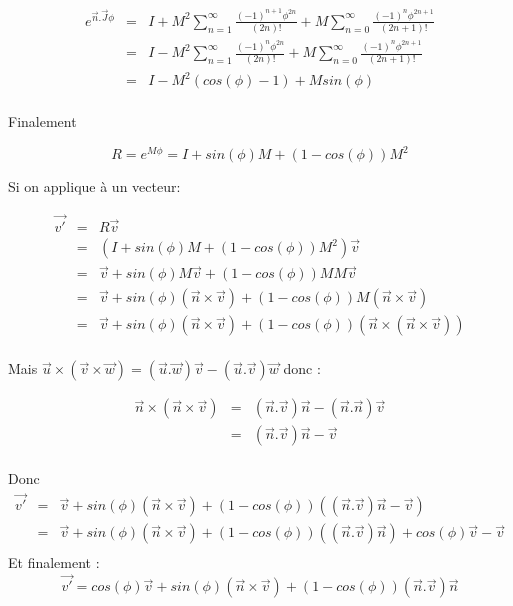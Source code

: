 \documentclass[12pt,a4paper]{article}
\begin{document}
	\begin{eqnarray*}
	e^{\vec{n}.\vec{J}\phi}&=& I+M^2\sum_{n=1}^{\infty} \frac{(-1)^{n+1} \phi^{2n}}{(2n)!} + M\sum_{n=0}^{\infty} \frac{(-1)^{n}\phi^{2n+1}}{(2n+1)!}\\
	&=& I-M^2\sum_{n=1}^{\infty} \frac{(-1)^{n} \phi^{2n}}{(2n)!} + M\sum_{n=0}^{\infty} \frac{(-1)^{n}\phi^{2n+1}}{(2n+1)!}\\
	&=& I-M^2 (cos(\phi)-1) + M sin(\phi)\\
	\end{eqnarray*}
	
	Finalement 
	
	\[
	\boxed{R=e^{M\phi}=I+sin(\phi)M+(1-cos(\phi))M^2 }
	\]
	
	\newpage
	Si on applique à un vecteur:
	
	\begin{eqnarray*}
	\vec{v'}&=& R \vec{v} \\
	&=& (I+sin(\phi)M+(1-cos(\phi))M^2) \vec{v} \\
	&=& \vec{v}+sin(\phi)M\vec{v}+(1-cos(\phi))M M\vec{v}  \\
	&=& \vec{v}+sin(\phi)(\vec{n}\times \vec{v})+(1-cos(\phi))M (\vec{n}\times \vec{v})  \\
	&=& \vec{v}+sin(\phi)(\vec{n}\times \vec{v})+(1-cos(\phi)) (\vec{n}\times (\vec{n}\times \vec{v}))  \\
	\end{eqnarray*}
	
Mais $\vec{u}\times(\vec{v}\times \vec{w})=(\vec{u}.\vec{w})\vec{v}-(\vec{u}.\vec{v})\vec{w}$ donc :
    
    \begin{eqnarray*}
    \vec{n}\times(\vec{n}\times \vec{v})&=&(\vec{n}.\vec{v})\vec{n}-(\vec{n}.\vec{n})\vec{v}\\
	&=&(\vec{n}.\vec{v})\vec{n}-\vec{v}\\	
	\end{eqnarray*}

Donc 
	\begin{eqnarray*}
		\vec{v'}&=& \vec{v}+sin(\phi)(\vec{n}\times \vec{v})+(1-cos(\phi)) ((\vec{n}.\vec{v})\vec{n}-\vec{v})  \\
		&=& \vec{v}+sin(\phi)(\vec{n}\times \vec{v})+(1-cos(\phi)) ((\vec{n}.\vec{v})\vec{n})+cos(\phi)\vec{v}-\vec{v}  \\
	\end{eqnarray*}
Et finalement :
\[
\boxed{\vec{v'}= cos(\phi)\vec{v}+sin(\phi)(\vec{n}\times \vec{v})+(1-cos(\phi)) (\vec{n}.\vec{v})\vec{n} }
\]
\end{document}
